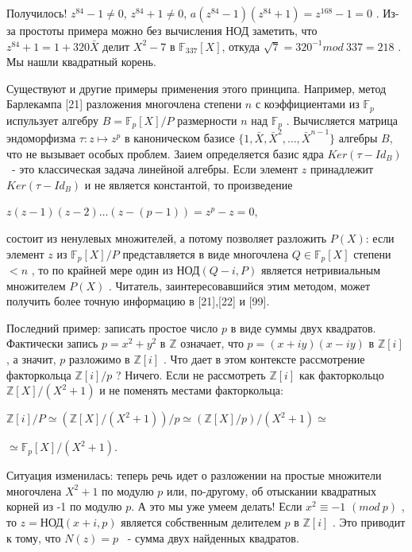Получилось! $z^{84}-1\not= 0$, $z^{84}+1\not= 0$, $a(z^{84}-1)(z^{84}+1)=z^{168}-1=0$
. Из-за простоты примера можно без вычисления НОД заметить, что $z^{84}+1=1+320\bar X$
 делит $X^2-7$
 в $\mathbb{F}_{337}[X]$, откуда $\sqrt 7 = 320^{-1} mod \ 337 = 218$
. Мы нашли квадратный корень.

Существуют и другие примеры применения этого принципа. Например, метод Барлекампа [21] разложения многочлена степени $n$
 с коэффициентами из $\mathbb{F}_p$
 испульзует алгебру $B=\mathbb{F}_p[X]/P$
 размерности $n$
 над $\mathbb{F}_p$
 . Вычисляется матрица эндоморфизма $\tau: z\mapsto z^p$
 в каноническом базисе $\{1,\bar X,\bar X^2,\ldots,\bar X^{n-1}\}$
 алгебры $B$, что не вызывает особых проблем. Заием определяется базис ядра $Ker(\tau-Id_B)$ 
 ~- это классическая задача линейной алгебры. Если элемент $z$
 принадлежит $Ker(\tau-Id_B)$
 и не является константой, то произведение

\begin{center}
$z(z-1)(z-2)\ldots(z-(p-1))=z^p-z=0$,
\end{center}


состоит из ненулевых множителей, а потому позволяет разложить $P(X)$:
если элемент $z$
 из  $\mathbb{F}_p[X]/P$
 представляется в виде многочлена $Q\in\mathbb{F}_p[X]$
 степени $<n$
 , то по крайней мере один из НОД$(Q-i,P)$
 является нетривиальным множителем $P(X)$
 . Читатель, заинтересовавшийся этим методом, может получить более точную информацию в [21],[22] и [99].

Последний пример: записать простое число $p$  в виде суммы двух квадратов. Фактически запись $p=x^2+y^2$
 в  $\mathbb{Z}$
 означает, что $p=(x+iy)(x-iy)$
 в  $\mathbb{Z}[i]$
 , а значит, $p$ разложимо в  $\mathbb{Z}[i]$
. Что дает в этом контексте рассмотрение факторкольца $\mathbb{Z}[i]/p$
? Ничего. Если не рассмотреть  $\mathbb{Z}[i]$
 как факторкольцо  $\mathbb{Z}[X]/(X^2+1)$
 и не поменять местами факторкольца:

\begin{center}
$\mathbb{Z}[i]/P\simeq(\mathbb{Z}[X]/(X^2+1))/p\simeq(\mathbb{Z}[X]/p)/(X^2+1)\simeq$

$\simeq \mathbb{F}_p[X]/(X^2+1)$.
\end{center}


Ситуация изменилась: теперь речь идет о разложении на простые множители многочлена $X^2+1$
 по модулю $p$ или, по-другому, об отыскании квадратных корней из -1 по модулю $p$. А это мы уже умеем делать! Если $x^2\equiv -1$ $(mod \ p)$
 , то $z =$НОД$(x+i,p)$
 является собственным делителем $p$
 в $\mathbb{Z}[i]$
 . Это приводит к тому, что $N(z)=p$
 ~- сумма двух найденных квадратов.

